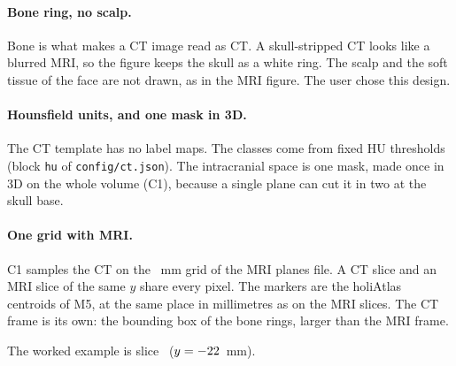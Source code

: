\documentclass[10pt,a4paper]{article}
\newcommand{\code}[1]{\texttt{#1}}
\begin{document}
\paragraph{Bone ring, no scalp.} Bone is what makes a CT image read as CT. A skull-stripped CT looks like a blurred MRI, so the
figure keeps the skull as a white ring. The scalp and the soft tissue of the face are not drawn, as in the MRI figure. The
user chose this design.

\paragraph{Hounsfield units, and one mask in 3D.} The CT template has no label maps. The classes come from fixed HU thresholds
(block \code{hu} of \code{config/ct.json}). The intracranial space is one mask, made once in 3D on the whole volume (C1),
because a single plane can cut it in two at the skull base.

\paragraph{One grid with MRI.} C1 samples the CT on the \ctVoxel~mm grid of the MRI planes file. A CT slice and an MRI slice
of the same $y$ share every pixel. The markers are the holiAtlas centroids of M5, at the same place in millimetres as on the
MRI slices. The CT frame is its own: the bounding box of the bone rings, larger than the MRI frame.

\medskip\noindent The worked example is slice~\ctExampleK{} ($y=-22$~mm).
\end{document}
